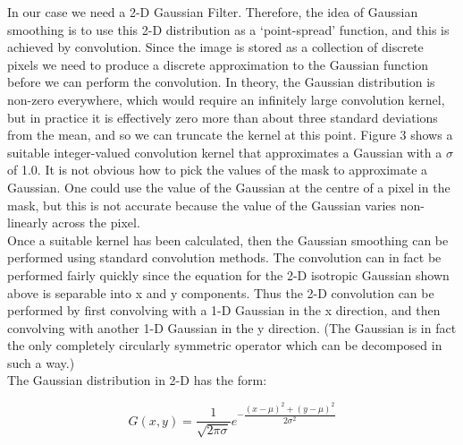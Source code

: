 In our case we need a 2-D Gaussian Filter. Therefore, the idea of Gaussian smoothing is to use this 2-D distribution as a `point-spread' function, and this is achieved by convolution. Since the image is stored as a collection of discrete pixels we need to produce a discrete approximation to the Gaussian function before we can perform the convolution. In theory, the Gaussian distribution is non-zero everywhere, which would require an infinitely large convolution kernel, but in practice it is effectively zero more than about three standard deviations from the mean, and so we can truncate the kernel at this point. Figure 3 shows a suitable integer-valued convolution kernel that approximates a Gaussian with a $\sigma$ of 1.0. It is not obvious how to pick the values of the mask to approximate a Gaussian. One could use the value of the Gaussian at the centre of a pixel in the mask, but this is not accurate because the value of the Gaussian varies non-linearly across the pixel.\\

Once a suitable kernel has been calculated, then the Gaussian smoothing can be performed using standard convolution methods. The convolution can in fact be performed fairly quickly since the equation for the 2-D isotropic Gaussian shown above is separable into x and y components. Thus the 2-D convolution can be performed by first convolving with a 1-D Gaussian in the x direction, and then convolving with another 1-D Gaussian in the y direction. (The Gaussian is in fact the only completely circularly symmetric operator which can be decomposed in such a way.) \\



The Gaussian distribution in 2-D has the form:

$$ G(x,y) = \dfrac{1}{\sqrt{2\pi\sigma}} e^{-\dfrac{(x-\mu)^2 + (y-\mu)^2}{2\sigma^2}}$$\\

\pagebreak

